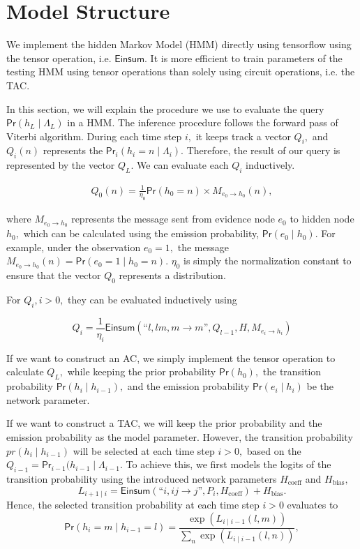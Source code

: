 \documentclass{article}
\def\pr{{\mathsf{Pr}}}
\def\esum{{\mathsf{Einsum}}}
\begin{document}
\section{Model Structure}
We implement the hidden Markov Model (HMM) directly using tensorflow using the tensor operation, i.e. \(\esum\). It is more efficient to train parameters of the testing HMM using tensor operations than solely using circuit operations, i.e. the TAC.

In this section, we will explain the procedure we use to evaluate the query \(\pr(h_L\mid \Lambda_{L})\) in a HMM. The inference procedure follows the forward pass of Viterbi algorithm. During each time step \(i,\) it keeps track a vector \(Q_i,\) and \(Q_i(n)\) represents the \(\pr_i(h_i = n  \mid \Lambda_i).\) Therefore, the result of our query is represented by the vector \(Q_L.\) We can evaluate each \(Q_i\) inductively.

\begin{align*}
  Q_0 (n) =\frac{1}{\eta_0} \pr(h_0 = n) \times M_{e_{0} \rightarrow h_{0}}(n),
\end{align*}

where \(M_{e_0 \rightarrow h_0}\) represents the message sent from evidence node \(e_0\) to hidden node \(h_0,\) which can be calculated using the emission probability, \(\pr(e_0 \mid h_0).\) For example, under the observation \(e_0 = 1,\) the message \(M_{e_0 \rightarrow h_0}(n) = \pr(e_0 = 1 \mid h_0 = n).\) \(\eta_0\) is simply the normalization constant to ensure that the vector \(Q_0\) represents a distribution.

For \(Q_i, i>0,\) they can be evaluated inductively using 

\[Q_{i}  = \frac{1}{\eta_{i}} \esum(\text{``$l, lm, m \rightarrow m$''}, Q_{l-1}, H, M_{e_i\rightarrow h_i})\]

If we want to construct an AC, we simply implement the tensor operation to calculate \(Q_L,\) while keeping the prior probability \(\pr(h_0),\) the transition probability \(\pr(h_i \mid h_{i-1}), \) and the emission probability \(\pr(e_i \mid h_i)\) be the network parameter. 

If we want to construct a TAC, we will keep the prior probability and the emission probability as the model parameter. However, the transition probability \(pr(h_i \mid h_{i-1})\) will be selected at each time step \(i > 0,\) based on the \(Q_{i-1} = \pr_{i-1}(h_{i-1} \mid \Lambda_{i-1}.\)
To achieve this, we first models the logits of the transition probability using the introduced network parameters \(H_{\text{coeff}} \) and \(H_{\text{bias}},\)
\[L_{i+1\mid i} = \esum(\text{``$i, ij \rightarrow j$''}, P_{i}, H_{\text{coeff}}) + H_{\text{bias}}.\]
Hence, the selected transition probability at each time step \(i>0\) evaluates to
\[\pr(h_i = m \mid  h_{i-1} = l) = \frac{\exp(L_{i \mid i-1}(l,m))}{\sum_n\exp(L_{i \mid i-1}(l,n))},\]
\end{document}
